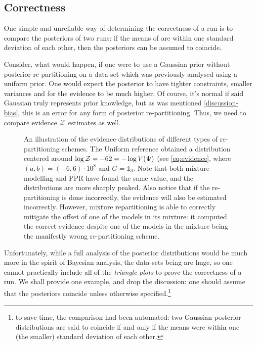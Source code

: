 \documentclass[usenatbib]{mnras}
\begin{document}
\subsection{Correctness}
\label{sec:org0cdb4f3}
One simple and unreliable way of determining the correctness of a
run is to compare the posteriors of two runs: if the means of are
within one standard deviation of each other, then the posteriors
can be assumed to coincide.

Consider, what would happen, if one were to use a Gaussian prior
without posterior re-partitioning on a data set which was
previously analysed using a uniform prior. One would expect the
posterior to have tighter constraints, smaller variances and for
the evidence to be much higher. Of course, it's normal if said
Gaussian truly represents prior knowledge, but as was mentioned
\autoref{discussion-bias}, this is an error for any form of posterior
re-partitioning. Thus, we need to compare evidence \({\cal Z}\)
estimates as well.

\begin{figure}

\caption{An illustration of the evidence distributions of different types of re-partitioning schemes. The Uniform reference obtained a distribution centered around \(\log {\cal Z} = -62 = - \log V(\Psi)\) (see \autoref{eq:evidence}, where \((a,b)=(-6, 6)\cdot 10^{8}\) and \(G=\mathds{1}_{3}\). Note that both mixture modelling and PPR have found the same value, and the distributions are more sharply peaked. Also notice that if the re-partitioning is done incorrectly, the evidence will also be estimated incorrectly. However, mixture repartitioning is able to correctly mitigate the offset of one of the models in its mixture: it computed the correct evidence despite one of the models in the mixture being the manifestly wrong re-partitioning scheme.  \label{fig:hist}}
\end{figure}



Unfortunately, while a full analysis of the posterior distributions
would be much more in the spirit of Bayesian analysis, the
data-sets being are huge, so one cannot practically include all of
the \emph{triangle plots} to prove the correctness of a run. We shall
provide one example, and drop the discussion: one should assume
that the posteriors coincide unless otherwise specified.\footnote{to save
time, the comparison had been automated: two Gaussian posterior
distributions are said to coincide if and only if the means were
within one (the smaller) standard deviation of each other.}
\end{document}
